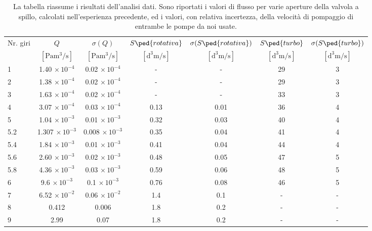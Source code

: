\begin{table}[b!]
    \centering
    \begin{tabular}{l c c c c c c}
        \toprule
        Nr. giri & $Q$ & $\sigma (Q)$ & $S\ped{rotativa}$ & $\sigma (S\ped{rotativa})$ & $S\ped{turbo}$ & $\sigma (S\ped{turbo})$ \\

        & $[\si{\Pa\cubic\meter\per\second}]$ & $[\si{\Pa\cubic\meter\per\second}]$ &
        $[\si{\cubic\deci\meter\per\second}]$ & $[\si{\cubic\deci\meter\per\second}]$ &
        $[\si{\cubic\deci\meter\per\second}]$ & $[\si{\cubic\deci\meter\per\second}]$ \\

        \midrule
        1   & 1.40  $\times \, 10^{-4}$ & 0.02 $\times \, 10^{-4}$    &   -  &   -  & 29 & 3 \\
        2   & 1.38  $\times \, 10^{-4}$ & 0.02 $\times \, 10^{-4}$    &   -  &   -  & 29 & 3 \\
        3   & 1.63  $\times \, 10^{-4}$ & 0.02 $\times \, 10^{-4}$    &   -  &   -  & 33 & 3 \\
        4   & 3.07  $\times \, 10^{-4}$ & 0.03 $\times \, 10^{-4}$    & 0.13 & 0.01 & 36 & 4 \\
        5   & 1.04  $\times \, 10^{-3}$ & 0.01 $\times \, 10^{-3}$ & 0.32 & 0.03 & 40 & 4 \\
        5.2 & 1.307 $\times \, 10^{-3}$ & 0.008 $\times \, 10^{-3}$   & 0.35 & 0.04 & 41 & 4 \\
        5.4 & 1.84  $\times \, 10^{-3}$ & 0.01 $\times \, 10^{-3}$    & 0.41 & 0.04 & 44 & 4 \\
        5.6 & 2.60  $\times \, 10^{-3}$ & 0.02 $\times \, 10^{-3}$    & 0.48 & 0.05 & 47 & 5 \\
        5.8 & 4.36  $\times \, 10^{-3}$ & 0.03 $\times \, 10^{-3}$    & 0.59 & 0.06 & 48 & 5 \\
        6   & 9.6   $\times \, 10^{-3}$ & 0.1 $\times \, 10^{-3}$     & 0.76 & 0.08 & 46 & 5 \\
        7   & 6.52  $\times \, 10^{-2}$ & 0.06 $\times \, 10^{-2}$    & 1.4  & 0.1  &  -  & -  \\
        8   & 0.412                     & 0.006                       & 1.8  & 0.2  &  -  &  - \\
        9   & 2.99                      & 0.07                        & 1.8  & 0.2  &  -  &  - \\
        \bottomrule
    \end{tabular}
    \caption{La tabella riassume i risultati dell'analisi dati. Sono riportati i valori di flusso per varie aperture della
    valvola a spillo, calcolati nell'esperienza precedente, ed i valori, con relativa incertezza, della velocità di pompaggio di
    entrambe le pompe da noi usate.}
    \label{tab:speed}
\end{table}
